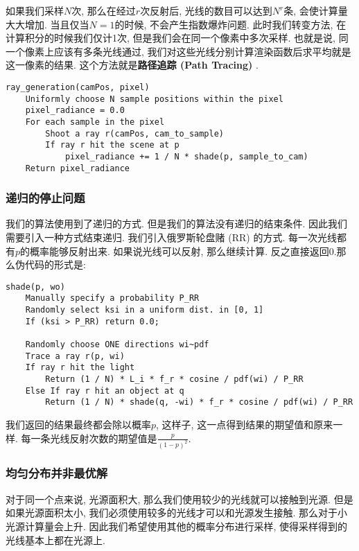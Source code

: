 如果我们采样$N$次, 那么在经过$r$次反射后, 光线的数目可以达到$N^r$条, 会使计算量大大增加. 当且仅当$N=1$的时候, 不会产生指数爆炸问题. 此时我们转变方法, 在计算积分的时候我们仅计1次, 但是我们会在同一个像素中多次采样. 也就是说, 同一个像素上应该有多条光线通过, 我们对这些光线分别计算渲染函数后求平均就是这一像素的结果. 这个方法就是\textbf{路径追踪 (Path Tracing) }. 

\begin{lstlisting}[caption=渲染函数解决指数爆炸伪代码]
ray_generation(camPos, pixel)
	Uniformly choose N sample positions within the pixel
	pixel_radiance = 0.0
	For each sample in the pixel
		Shoot a ray r(camPos, cam_to_sample)
		If ray r hit the scene at p
			pixel_radiance += 1 / N * shade(p, sample_to_cam)
	Return pixel_radiance
\end{lstlisting}

\subsubsection{递归的停止问题}
我们的算法使用到了递归的方式. 但是我们的算法没有递归的结束条件. 因此我们需要引入一种方式结束递归. 我们引入俄罗斯轮盘赌 (RR) 的方式. 每一次光线都有$p$的概率能够反射出来. 如果说光线可以反射, 那么继续计算. 反之直接返回0.那么伪代码的形式是: 

\begin{lstlisting}[caption=包含递归停止条件的渲染函数伪代码]
shade(p, wo)
	Manually specify a probability P_RR
	Randomly select ksi in a uniform dist. in [0, 1]
	If (ksi > P_RR) return 0.0;
	 
	Randomly choose ONE directions wi~pdf
	Trace a ray r(p, wi)
	If ray r hit the light
		Return (1 / N) * L_i * f_r * cosine / pdf(wi) / P_RR
	Else If ray r hit an object at q
		Return (1 / N) * shade(q, -wi) * f_r * cosine / pdf(wi) / P_RR
\end{lstlisting}

我们返回的结果最终都会除以概率$p$, 这样子, 这一点得到结果的期望值和原来一样. 每一条光线反射次数的期望值是$\frac{p}{(1-p)^2}$.

\subsubsection{均匀分布并非最优解}

对于同一个点来说, 光源面积大, 那么我们使用较少的光线就可以接触到光源. 但是如果光源面积太小, 我们必须使用较多的光线才可以和光源发生接触. 那么对于小光源计算量会上升. 因此我们希望使用其他的概率分布进行采样, 使得采样得到的光线基本上都在光源上. 

